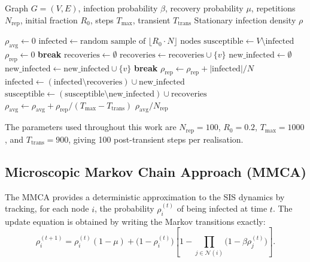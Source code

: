 \documentclass{article}
\begin{document}
\begin{algorithm}[ht]
\caption{SIS Monte Carlo simulation (naive)}
\label{alg:sis_naive}
\begin{algorithmic}[1]
\Require Graph $G=(V,E)$, infection probability $\beta$, recovery probability $\mu$, repetitions $N_{\text{rep}}$, initial fraction $R_0$, steps $T_{\max}$, transient $T_{\text{trans}}$
\Ensure  Stationary infection density $\rho$

\State $\rho_{\text{avg}} \gets 0$
    \State $\text{infected} \gets \text{random sample of } \lfloor R_0 \cdot N \rfloor \text{ nodes}$
    \State $\text{susceptible} \gets V \setminus \text{infected}$
    \State $\rho_{\text{rep}} \gets 0$
         \textbf{break} \EndIf
        \State $\text{recoveries} \gets \emptyset$
             \quad $\text{recoveries} \gets \text{recoveries} \cup \{v\}$ \EndIf
        \EndFor
        \State $\text{new\_infected} \gets \emptyset$
                    \State $\text{new\_infected} \gets \text{new\_infected} \cup \{v\}$
                    \State \textbf{break}
                \EndIf
            \EndFor
        \EndFor
            \State $\rho_{\text{rep}} \gets \rho_{\text{rep}} + |\text{infected}| / N$
        \EndIf
        \State $\text{infected} \gets (\text{infected} \setminus \text{recoveries}) \cup \text{new\_infected}$
        \State $\text{susceptible} \gets (\text{susceptible} \setminus \text{new\_infected}) \cup \text{recoveries}$
    \EndFor
    \State $\rho_{\text{avg}} \gets \rho_{\text{avg}} + \rho_{\text{rep}} / (T_{\max} - T_{\text{trans}})$
\EndFor
\State \Return $\rho_{\text{avg}} / N_{\text{rep}}$
\end{algorithmic}
\end{algorithm}

The parameters used throughout this work are $N_{\text{rep}} = 100$, $R_0 = 0.2$, $T_{\max} = 1000$, and $T_{\text{trans}} = 900$, giving 100 post-transient steps per realisation.

\subsection{Microscopic Markov Chain Approach (MMCA)}\label{mmca}
The MMCA \cite{gomez2010discrete} provides a deterministic approximation to the SIS dynamics by tracking, for each node $i$, the probability $\rho_i^{(t)}$ of being infected at time $t$. The update equation is obtained by writing the Markov transitions exactly:
\begin{equation}
    \rho_i^{(t+1)} = \rho_i^{(t)}(1-\mu) + \bigl(1 - \rho_i^{(t)}\bigr) \left[1 - \prod_{j \in \mathcal{N}(i)}\!\bigl(1 - \beta\rho_j^{(t)}\bigr)\right].
\end{equation}
\end{document}
